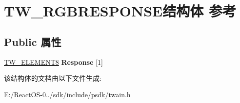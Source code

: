 \hypertarget{struct_t_w___r_g_b_r_e_s_p_o_n_s_e}{}\section{T\+W\+\_\+\+R\+G\+B\+R\+E\+S\+P\+O\+N\+S\+E结构体 参考}
\label{struct_t_w___r_g_b_r_e_s_p_o_n_s_e}
\subsection*{Public 属性}
\begin{DoxyCompactItemize}
\item 
\mbox{\label{struct_t_w___r_g_b_r_e_s_p_o_n_s_e_a3a64ac7ab40281cc587a774d05d2f35f}} 
\hyperlink{struct_t_w___e_l_e_m_e_n_t8}{T\+W\+\_\+\+E\+L\+E\+M\+E\+N\+T8} {\bfseries Response} \mbox{[}1\mbox{]}
\end{DoxyCompactItemize}


该结构体的文档由以下文件生成\+:\begin{DoxyCompactItemize}
\item 
E\+:/\+React\+O\+S-\/0../sdk/include/psdk/twain.\+h\end{DoxyCompactItemize}
